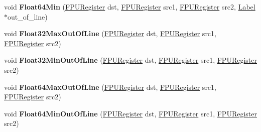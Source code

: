 \begin{DoxyCompactItemize}
\item 
\mbox{\label{classv8_1_1internal_1_1TurboAssembler_a4a7dfd2a62b48405cdbe23d46dda9e7d}} 
void {\bfseries Float64\+Min} (\mbox{\hyperlink{classv8_1_1internal_1_1FPURegister}{F\+P\+U\+Register}} dst, \mbox{\hyperlink{classv8_1_1internal_1_1FPURegister}{F\+P\+U\+Register}} src1, \mbox{\hyperlink{classv8_1_1internal_1_1FPURegister}{F\+P\+U\+Register}} src2, \mbox{\hyperlink{classv8_1_1internal_1_1Label}{Label}} $\ast$out\+\_\+of\+\_\+line)
\item 
\mbox{\label{classv8_1_1internal_1_1TurboAssembler_a7b389501f2514c3642becd5469512abc}} 
void {\bfseries Float32\+Max\+Out\+Of\+Line} (\mbox{\hyperlink{classv8_1_1internal_1_1FPURegister}{F\+P\+U\+Register}} dst, \mbox{\hyperlink{classv8_1_1internal_1_1FPURegister}{F\+P\+U\+Register}} src1, \mbox{\hyperlink{classv8_1_1internal_1_1FPURegister}{F\+P\+U\+Register}} src2)
\item 
\mbox{\label{classv8_1_1internal_1_1TurboAssembler_a4c90f67dc99803675880326d9754b6be}} 
void {\bfseries Float32\+Min\+Out\+Of\+Line} (\mbox{\hyperlink{classv8_1_1internal_1_1FPURegister}{F\+P\+U\+Register}} dst, \mbox{\hyperlink{classv8_1_1internal_1_1FPURegister}{F\+P\+U\+Register}} src1, \mbox{\hyperlink{classv8_1_1internal_1_1FPURegister}{F\+P\+U\+Register}} src2)
\item 
\mbox{\label{classv8_1_1internal_1_1TurboAssembler_af06f0dbf7adddcf6c1f37bb8574f4aff}} 
void {\bfseries Float64\+Max\+Out\+Of\+Line} (\mbox{\hyperlink{classv8_1_1internal_1_1FPURegister}{F\+P\+U\+Register}} dst, \mbox{\hyperlink{classv8_1_1internal_1_1FPURegister}{F\+P\+U\+Register}} src1, \mbox{\hyperlink{classv8_1_1internal_1_1FPURegister}{F\+P\+U\+Register}} src2)
\item 
\mbox{\label{classv8_1_1internal_1_1TurboAssembler_a951233a290c88a341a52d5a6c0db6dc5}} 
void {\bfseries Float64\+Min\+Out\+Of\+Line} (\mbox{\hyperlink{classv8_1_1internal_1_1FPURegister}{F\+P\+U\+Register}} dst, \mbox{\hyperlink{classv8_1_1internal_1_1FPURegister}{F\+P\+U\+Register}} src1, \mbox{\hyperlink{classv8_1_1internal_1_1FPURegister}{F\+P\+U\+Register}} src2)
\item 

\end{DoxyCompactItemize}
